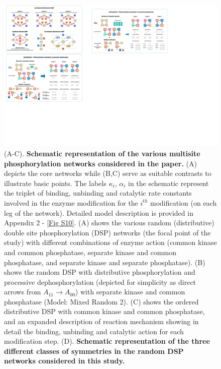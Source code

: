 \documentclass[9pt,lineno]{elife}
\begin{document}
\begin{figure}[H]
    \begin{fullwidth}
    \centering
    \includegraphics[width = 0.561\paperwidth, keepaspectratio]{Fig01.pdf}
    \caption{(A-C). \textbf{Schematic representation of the various multisite phosphorylation networks considered in the paper.} (A) depicts the core networks while (B,C) serve as suitable contrasts to illustrate basic points. The labels $\kappa_i$, $\alpha_i$ in the schematic represent the triplet of binding, unbinding and catalytic rate constants involved in the enzyme modification for the $i^{th}$ modification (on each leg of the network). Detailed model description is provided in Appendix 2 - \cref{Fig S10}. (A) shows the various random (distributive) double site phosphorylation (DSP) networks (the focal point of the study) with different combinations of enzyme action (common kinase and common phosphatase, separate kinase and common phosphatase, and separate kinase and separate phosphatase). (B) shows the random DSP with distributive phosphorylation and processive dephosphorylation (depicted for simplicity as direct arrows from $A_{11} \rightarrow A_{00}$) with separate kinase and common phosphatase (Model: Mixed Random 2). (C) shows the ordered distributive DSP with common kinase and common phosphatase, and an expanded description of reaction mechanism showing in detail the binding, unbinding and catalytic action for each modification step. (D). \textbf{Schematic representation of the three different classes of symmetries in the random DSP networks considered in this study.} 
}
\end{fullwidth}
\end{figure}
\end{document}
